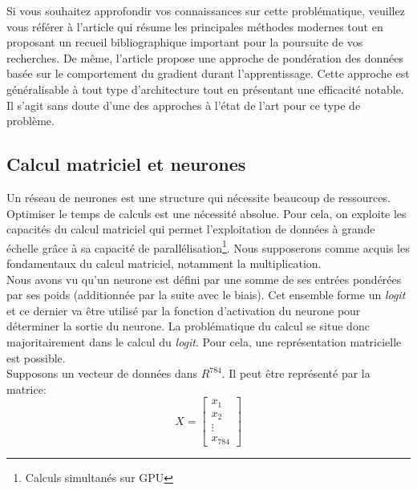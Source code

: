 \noindent Si vous souhaitez approfondir vos connaissances sur cette problématique, veuillez vous référer à l'article \cite{multilabellearn} qui résume les principales méthodes modernes tout en proposant un recueil bibliographique important pour la poursuite de vos recherches. De même, l'article \cite{weightedex} propose une approche de pondération des données basée sur le comportement du gradient durant l'apprentissage. Cette approche est généralisable à tout type d'architecture tout en présentant une efficacité notable. Il s'agit sans doute d'une des approches à l'état de l'art pour ce type de problème.

\subsection{Calcul matriciel et neurones}
\label{matricie_calcul_nn}
Un réseau de neurones est une structure qui nécessite beaucoup de ressources. Optimiser le temps de calculs est une nécessité absolue. Pour cela, on exploite les capacités du calcul matriciel qui permet l'exploitation de données à grande échelle grâce à sa capacité de parallélisation\footnote{Calculs simultanés sur GPU}. Nous supposerons comme acquis les fondamentaux du calcul matriciel, notamment la multiplication.\\

\noindent Nous avons vu qu'un neurone est défini par une somme de ses entrées pondérées par ses poids (additionnée par la suite avec le biais). Cet ensemble forme un \textit{logit} et ce dernier va être utilisé par la fonction d'activation du neurone pour déterminer la sortie du neurone. La problématique du calcul se situe donc majoritairement dans le calcul du \textit{logit}. Pour cela, une représentation matricielle est possible.\\

\noindent Supposons un vecteur de données dans $R^{784}$. Il peut être représenté par la matrice:
$$X=\begin{bmatrix}
   x_{1} \\
   x_{2} \\
   \vdots \\
   x_{784}
\end{bmatrix}$$

